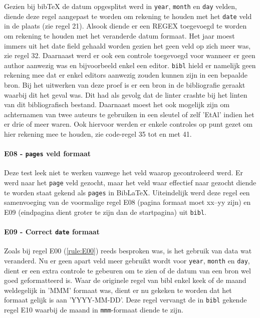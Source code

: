 Gezien bij bibTeX de datum opgesplitst werd in \texttt{year}, \texttt{month} en \texttt{day} velden, diende deze regel aangepast te worden om rekening te houden met het \texttt{date} veld in de plaats (zie regel 21). Alsook diende er een \acrfull{REGEX} toegevoegd te worden om rekening te houden met het veranderde datum formaat. Het jaar moest immers uit het date field gehaald worden gezien het geen veld op zich meer was, zie regel 32. Daarnaast werd er ook een controle toegevoegd voor wanneer er geen author aanwezig was en bijvoorbeeld enkel een editor. \texttt{bibl} hield er namelijk geen rekening mee dat er enkel editors aanwezig zouden kunnen zijn in een bepaalde bron. Bij het uitwerken van deze proef is er een bron in de bibliografie geraakt waarbij dit het geval was. Dit had als gevolg dat de linter crashte bij het linten van dit bibliografisch bestand.
Daarnaast moest het ook mogelijk zijn om achternamen van twee auteurs te gebruiken in een sleutel of zelf 'EtAl' indien het er drie of meer waren. Ook hiervoor werden er enkele controles op punt gezet om hier rekening mee te houden, zie code-regel 35 tot en met 41.

\paragraph{E08 - \texttt{pages} veld formaat}
Deze test leek niet te werken vanwege het veld waarop gecontroleerd werd. Er werd naar het \texttt{page} veld gezocht, maar het veld waar effectief naar gezocht diende te worden staat gekend als \texttt{pages} in BibLaTeX. Uiteindelijk werd deze regel een samenvoeging van de voormalige regel E08 (pagina formaat moet xx--yy zijn) en E09 (eindpagina dient groter te zijn dan de startpagina) uit \texttt{bibl}.

\paragraph{E09 - Correct \texttt{date} formaat}
Zoals bij regel E00 (\ref{rule:E00}) reeds besproken was, is het gebruik van data wat veranderd. Nu er geen apart veld meer gebruikt wordt voor \texttt{year}, \texttt{month} en \texttt{day}, dient er een extra controle te gebeuren om te zien of de datum van een bron wel goed geformatteerd is. Waar de originele regel van bibl enkel keek of de maand weldegelijk in 'MMM' formaat was, dient er nu gekeken te worden dat het formaat gelijk is aan 'YYYY-MM-DD'. Deze regel vervangt de in \texttt{bibl} gekende regel E10 waarbij de maand in \texttt{mmm}-formaat diende te zijn.

